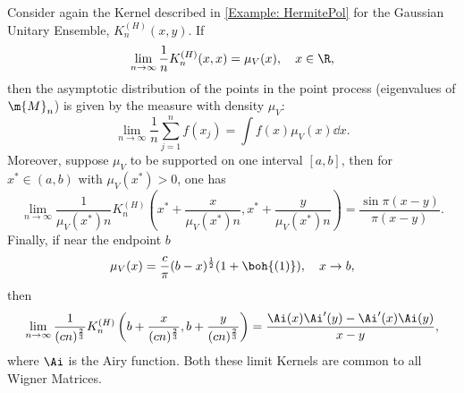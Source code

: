  \begin{exemplo}	\label{Theorem: Local law}
 	Consider again the Kernel described in \autoref{Example: HermitePol} for the Gaussian Unitary Ensemble,  $K^{(H)}_n(x,y)$. If
 	\begin{equation}
 		\lim_{n \rightarrow \infty} \frac{1}{n} K^{(H)}_n(x,x) = \mu_V(x), \quad x \in \R,
 	\end{equation}	
 	then the asymptotic distribution of the points in the point process (eigenvalues of $\m{M}_n$) is given by the measure with density $\mu_V$:
 	\begin{equation}
 		\lim_{n \rightarrow \infty} \frac{1}{n} \sum_{j=1}^{n} f(x_j) = \int f(x) \mu_V(x) \dd x.
 	\end{equation}
 	Moreover, suppose $\mu_V$ to be supported on one interval $[a,b]$, then for $x^* \in (a, b)$ with $\mu_V(x^*) > 0$, one has
 	\begin{equation}
 		\lim_{n \rightarrow \infty} \frac{1}{\mu_V(x^*) n} K^{(H)}_n\left(x^* + \frac{x}{\mu_V(x^*)n}, x^* + \frac{y}{\mu_V(x^*)n}\right) = \frac{\sin \pi(x - y)}{\pi(x - y)}.
 	\end{equation}
 	Finally, if near the endpoint $b$
 	\begin{equation}
 		\mu_V(x) = \frac{c}{\pi} (b-x)^{\frac{1}{2}} (1 + \boh{(1)}), \quad x \rightarrow b,
 	\end{equation}
 	then
 	\begin{equation}
 		\lim_{n \rightarrow \infty} \frac{1}{(cn)^{\frac{2}{3}}} K^{(H)}_n\left(b + \frac{x}{(cn)^{\frac{2}{3}}}, b + \frac{y}{(cn)^{\frac{2}{3}}}\right) = \frac{\Ai(x) \Ai'(y) - \Ai'(x) \Ai(y)}{x - y},
 	\end{equation}
 	where $\Ai$ is the Airy function. Both these limit Kernels are common to all Wigner Matrices.
 \end{exemplo}
 